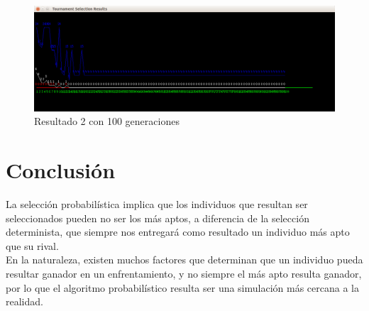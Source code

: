 \documentclass[11pt,letterpaper]{article}
\begin{document}
\begin{figure}[H]
	\centering
	\includegraphics[scale = 0.4]{images/100gen2}
	\caption{Resultado 2 con 100 generaciones}
\end{figure}


\section*{Conclusión}

La selección probabilística implica que los individuos que resultan ser seleccionados pueden no ser los más aptos, a diferencia de la selección determinista, que siempre nos entregará como resultado un individuo más apto que su rival.\\

En la naturaleza, existen muchos factores que determinan que un individuo pueda resultar ganador en un enfrentamiento, y no siempre el más apto resulta ganador, por lo que el algoritmo probabilístico resulta ser una simulación más cercana a la realidad.
\end{document}
